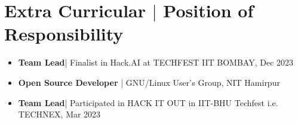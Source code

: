 \documentclass[legalpaper,11pt]{article}
\begin{document}
\section{Extra Curricular $|$ \normalsize{Position of Responsibility}}
\begin{itemize}[leftmargin=*]
    \item \textbf {Team Lead}| Finalist in Hack.AI at TECHFEST IIT BOMBAY, Dec 2023
    \item \textbf {Open Source Developer} | GNU/Linux User's Group, NIT Hamirpur
    \item \textbf {Team Lead}| Participated in HACK IT OUT in IIT-BHU Techfest i.e. TECHNEX, Mar 2023

\end{itemize}
\end{document}
